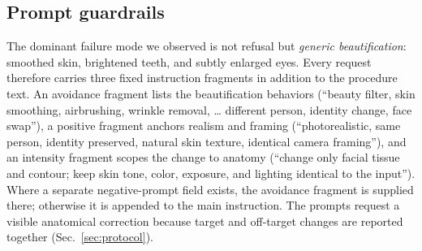 \subsection{Prompt guardrails}
\label{sec:guardrails}

The dominant failure mode we observed is not refusal but \emph{generic
beautification}: smoothed skin, brightened teeth, and subtly enlarged eyes. Every
request therefore carries three fixed instruction fragments in addition to the
procedure text. An avoidance fragment lists the beautification behaviors
(``beauty filter, skin smoothing,
airbrushing, wrinkle removal, \ldots{} different person, identity change, face
swap''), a positive fragment anchors realism and framing (``photorealistic, same
person, identity preserved, natural skin texture, identical camera framing''), and
an intensity fragment scopes the change to anatomy (``change only facial tissue and
contour; keep skin tone, color, exposure, and lighting identical to the input'').
Where a separate negative-prompt field exists, the avoidance fragment is supplied
there; otherwise it is appended to the main instruction. The prompts request a
visible anatomical correction because target and off-target changes are reported
together (Sec.~\ref{sec:protocol}).
